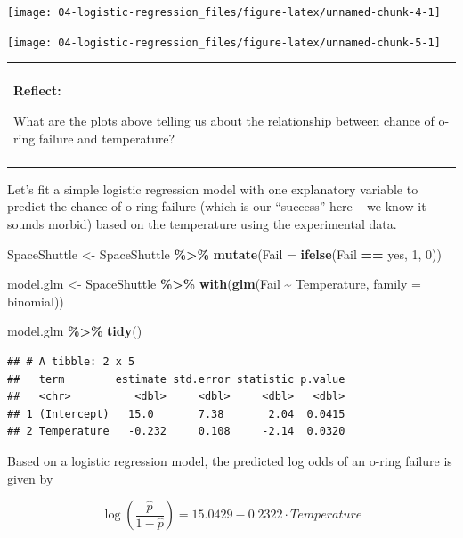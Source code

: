 \documentclass[
]{book}
\newenvironment{Shaded}{\begin{snugshade}}{\end{snugshade}}
\newcommand{\AttributeTok}[1]{\textcolor[rgb]{0.13,0.29,0.53}{#1}}
\newcommand{\DecValTok}[1]{\textcolor[rgb]{0.00,0.00,0.81}{#1}}
\newcommand{\FunctionTok}[1]{\textcolor[rgb]{0.13,0.29,0.53}{\textbf{#1}}}
\newcommand{\NormalTok}[1]{#1}
\newcommand{\OtherTok}[1]{\textcolor[rgb]{0.56,0.35,0.01}{#1}}
\newcommand{\SpecialCharTok}[1]{\textcolor[rgb]{0.81,0.36,0.00}{\textbf{#1}}}
\newcommand{\StringTok}[1]{\textcolor[rgb]{0.31,0.60,0.02}{#1}}
\newenvironment{reflect}
{
    \begin{center}
    
    \begin{tabular}{|p{0.8\textwidth}|}
    \rowcolor{LightBlue}
    \hline\\
    \rowcolor{LightBlue}
    \textbf{Reflect:}
}
{
    \\\rowcolor{LightBlue}
    \\\hline
    \end{tabular} 
    \end{center}
}
\begin{document}
\begin{center}\texttt{[image: 04-logistic-regression\_files/figure-latex/unnamed-chunk-4-1]} \end{center}

\begin{center}\texttt{[image: 04-logistic-regression\_files/figure-latex/unnamed-chunk-5-1]} \end{center}

\begin{reflect}
What are the plots above telling us about the relationship between
chance of o-ring failure and temperature?
\end{reflect}

Let's fit a simple logistic regression model with one explanatory variable to predict the chance of o-ring failure (which is our ``success'' here -- we know it sounds morbid) based on the temperature using the experimental data.

\begin{Shaded}
\begin{Highlighting}[]
\NormalTok{SpaceShuttle }\OtherTok{\textless{}{-}}\NormalTok{ SpaceShuttle }\SpecialCharTok{\%\textgreater{}\%}
  \FunctionTok{mutate}\NormalTok{(}\AttributeTok{Fail =} \FunctionTok{ifelse}\NormalTok{(Fail }\SpecialCharTok{==} \StringTok{\textquotesingle{}yes\textquotesingle{}}\NormalTok{, }\DecValTok{1}\NormalTok{, }\DecValTok{0}\NormalTok{))}

\NormalTok{model.glm }\OtherTok{\textless{}{-}}\NormalTok{ SpaceShuttle }\SpecialCharTok{\%\textgreater{}\%}
  \FunctionTok{with}\NormalTok{(}\FunctionTok{glm}\NormalTok{(Fail }\SpecialCharTok{\textasciitilde{}}\NormalTok{ Temperature, }\AttributeTok{family =}\NormalTok{ binomial))}

\NormalTok{model.glm }\SpecialCharTok{\%\textgreater{}\%} 
  \FunctionTok{tidy}\NormalTok{()}
\end{Highlighting}
\end{Shaded}

\begin{verbatim}
## # A tibble: 2 x 5
##   term        estimate std.error statistic p.value
##   <chr>          <dbl>     <dbl>     <dbl>   <dbl>
## 1 (Intercept)   15.0       7.38       2.04  0.0415
## 2 Temperature   -0.232     0.108     -2.14  0.0320
\end{verbatim}

Based on a logistic regression model, the predicted log odds of an o-ring failure is given by

\[\log\left(\frac{\hat{p}}{1-\hat{p}}\right) = 15.0429 -0.2322\cdot Temperature\]
\end{document}
